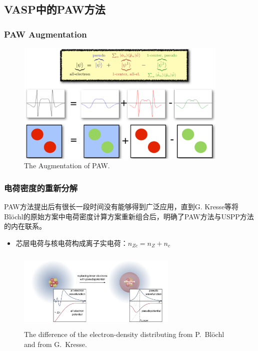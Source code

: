 {\subsection{\rm{VASP}中的\rm{PAW}方法}
\frame
{
	\frametitle{\textrm{PAW Augmentation}}
\begin{figure}[h!]
\centering
\includegraphics[height=2.3in,width=4.0in,viewport=0 0 1280 745,clip]{Figures/PAW-baseset.png}
\caption{\tiny \textrm{The Augmentation of PAW.}}%
\label{PAW_baseset}
\end{figure}
}


\frame
{
\frametitle{电荷密度的重新分解}
\textrm{PAW}方法提出后有很长一段时间没有能够得到广泛应用，直到\textrm{G. Kresse}等将\textrm{Bl\"ochl}的原始方案中电荷密度计算方案重新组合后，明确了\textrm{PAW}方法与\textrm{USPP}方法的内在联系。
\begin{itemize}
	\item 芯层电荷与核电荷构成离子实电荷：$n_{Zc}=n_Z+n_c$
\end{itemize}
\begin{figure}[h!]
\centering
\vspace{-10.5pt}
\includegraphics[height=1.5in,width=3.0in,viewport=0 0 380 190,clip]{Figures/Pseudo-potential_charge.png}
\caption{\tiny \textrm{The difference of the electron-density distributing from P.~Bl\"ochl  and from G.~Kresse.}}%
\label{PAW_Pseudo-Charge}
\end{figure}
}

}
